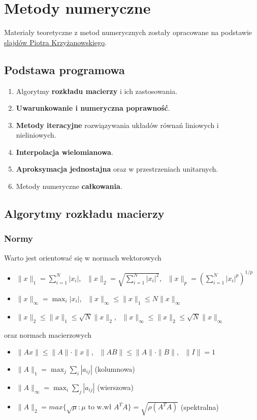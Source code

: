 \chapter{Metody numeryczne}

Materiały teoretyczne z metod numerycznych zostały opracowane na podstawie \href{https://www.mimuw.edu.pl/~przykry/mn/moon-handouts.pdf}{slajdów Piotra Krzyżanowskiego}.

\section*{Podstawa programowa}
\begin{enumerate}
    \item Algorytmy \textbf{rozkładu macierzy} i ich zastosowania.
    \item \textbf{Uwarunkowanie i numeryczna poprawność}.
    \item \textbf{Metody iteracyjne} rozwiązywania układów równań liniowych i nieliniowych.
    \item \textbf{Interpolacja wielomianowa}.
    \item \textbf{Aproksymacja jednostajna} oraz w przestrzeniach unitarnych.
    \item Metody numeryczne \textbf{całkowania}.
\end{enumerate}

\section{Algorytmy rozkładu macierzy}
\subsection{Normy}
Warto jest orientować się w normach wektorowych
\begin{itemize}
    \item $\|x\|_1 = \sum_{i=1}^{N}|x_i|$, $\ \ \|x\|_2 = \sqrt{\sum_{i=1}^N|x_i|^2}$, $\ \ \|x\|_p = \left(\sum_{i=1}^N|x_i|^p \right)^{1/p}$
    \item $\|x\|_{\infty} = \max_i|x_i|$, $\ \ \|x\|_{\infty}\leq \|x\|_1\leq N\|x\|_{\infty}$
    \item $\|x\|_2 \leq \|x\|_1\leq \sqrt{N}\|x\|_2$, $\ \ \|x\|_{\infty} \leq \|x\|_2 \leq \sqrt{N}\|x\|_{\infty}$
\end{itemize}
oraz normach macierzowych
\begin{itemize}
    \item $\|Ax\|\leq \|A\|\cdot \|x\|$, $\ \ \|AB\| \leq \|A\|\cdot\|B\|$, $\ \ \|I\|=1$
    \item $\|A\|_1=\max_j\sum_i|a_{ij}|$ (kolumnowa)
    \item $\|A\|_{\infty}=\max_i\sum_j|a_{ij}|$ (wierszowa)
    \item $\|A\|_2 = max\{\sqrt{\mu} : \mu \mbox{ to w.wł } A^TA\} = \sqrt{\rho(A^TA)}$ (spektralna)
\end{itemize}


